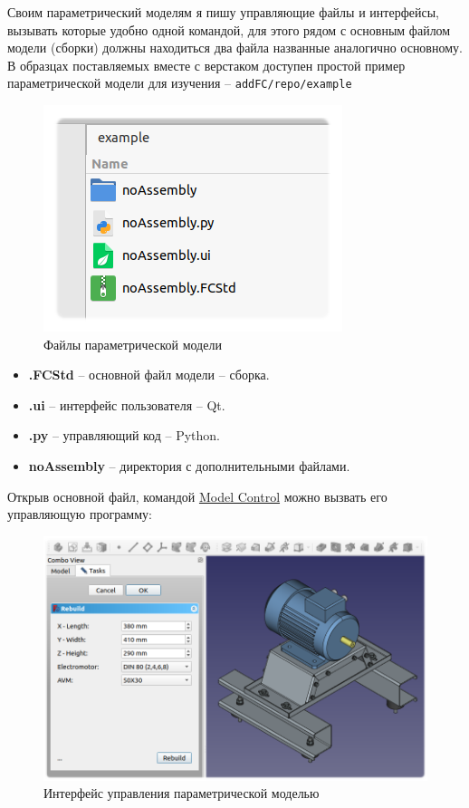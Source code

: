 \documentclass[a4paper,12pt]{article}
\begin{document}
Своим параметрический моделям я пишу управляющие файлы и интерфейсы, вызывать которые удобно одной командой, для этого рядом с основным файлом модели (сборки) должны находиться два файла названные аналогично основному.\\

В образцах поставляемых вместе с верстаком доступен простой пример параметрической модели для изучения -- \verb|addFC/repo/example|

\begin{figure}[htp]
	\centering
	\includegraphics[scale=1]{img/example.png}
	\caption{Файлы параметрической модели}
	\label{sec:example}
	\end{figure}

\begin{itemize}
	\item \textbf{.FCStd} -- основной файл модели -- сборка.
	\item \textbf{.ui} -- интерфейс пользователя -- Qt.
	\item \textbf{.py} -- управляющий код -- Python.
	\item \textbf{noAssembly} -- директория с дополнительными файлами.
\end{itemize}

\pagebreak

\begin{flushleft}Открыв основной файл, командой \hyperref[sec:3]{Model Control} можно вызвать его управляющую программу:\end{flushleft}

\begin{figure}[htp]
	\centering
	\includegraphics[width=1\textwidth]{img/example_mc.png}
	\caption{Интерфейс управления параметрической моделью}
	\label{sec:example_mc}
\end{figure}
\end{document}
